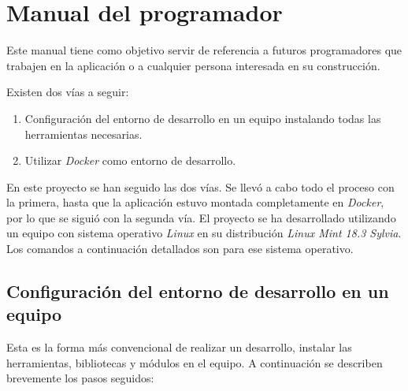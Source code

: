 \section{Manual del programador}

Este manual tiene como objetivo servir de referencia a futuros programadores que trabajen en la aplicación o a cualquier persona interesada en su construcción. 

Existen dos vías a seguir:

\begin{enumerate}

\item Configuración del entorno de desarrollo en un equipo instalando todas las herramientas necesarias. 

\item Utilizar \emph{Docker} como entorno de desarrollo. 

\end{enumerate}

En este proyecto se han seguido las dos vías. Se llevó a cabo todo el proceso con la primera, hasta que la aplicación estuvo montada completamente en \emph{Docker}, por lo que se siguió con la segunda vía. 
El proyecto se ha desarrollado utilizando un equipo con sistema operativo \emph{Linux} en su distribución \emph{Linux Mint 18.3 Sylvia}. Los comandos a continuación detallados son para ese sistema operativo.

\subsection{Configuración del entorno de desarrollo en un equipo}

Esta es la forma más convencional de realizar un desarrollo, instalar  las herramientas, bibliotecas y módulos en el equipo. A continuación se describen brevemente los pasos seguidos:

